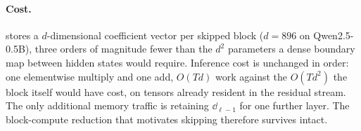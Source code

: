 \paragraph{Cost.} \mname stores a $d$-dimensional coefficient vector per skipped
block ($d = 896$ on Qwen2.5-0.5B), three orders of magnitude fewer than the $d^2$
parameters a dense boundary map between hidden states would require. Inference cost is unchanged in order: one elementwise multiply and one add,
$O(Td)$ work against the $O(Td^2)$ the block itself would have cost, on tensors
already resident in the residual stream. The only additional memory traffic is
retaining $\dd_{\ell-1}$ for one further layer. The block-compute reduction that
motivates skipping therefore survives intact.
